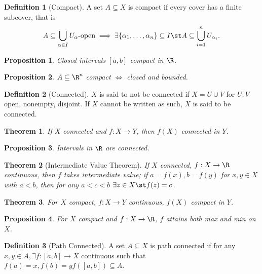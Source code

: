 \documentclass[12pt, oneside]{article}
\theoremstyle{definition}
\newtheorem{defn}{Definition}
\theoremstyle{plain}
\newtheorem{thm}{Theorem}
\newtheorem{prop}{Proposition}
\theoremstyle{remark}
\begin{document}
\begin{defn}[Compact]
  A set $A \subseteq X$ is compact if every cover has a finite subcover, that is \[
  A \subseteq \bigcup_{\alpha \in I} U_\alpha \text{-open} \implies \exists \{\alpha_1, \dots, \alpha_n\}   \subseteq I \st A \subseteq \bigcup_{i=1}^n U_{\alpha_i}.
  \]
\end{defn}

\begin{prop}
  Closed intervals $[a, b]$ compact in $\R$.
\end{prop}

\begin{prop}
  $A \subseteq \R^n$ compact $\iff $ closed and bounded.
\end{prop}

\begin{defn}[Connected]
  $X$ is said to not be connected if $X = U \cup V$ for $U, V$ open, nonempty, disjoint. If $X$ cannot be written as such, $X$ is said to be connected.
\end{defn}

\begin{thm}
  If $X$ connected and $f : X \to Y$, then $f(X)$ connected in $Y$.
\end{thm}

\begin{prop}
  Intervals in $\R$ are connected.
\end{prop}

\begin{thm}[Intermediate Value Theorem]
  If $X$ connected, $f : X \to \R$ continuous, then $f$ takes intermediate value; if $a = f(x), b = f(y)$ for $x, y \in X$ with $a < b$, then for any $a < c < b$ $\exists z \in X \st f(z) = c$.
\end{thm}

\begin{thm}
  For $X$ compact, $f : X \to Y$ continuous, $f(X)$ compact in $Y$.
\end{thm}

\begin{prop}
  For $X$ compact and $f: X \to \R$, $f$ attains both max and min on $X$.
\end{prop}

\begin{defn}[Path Connected]
  A set $A \subseteq X$ is path connected if for any $x, y \in A, \exists f : [a, b] \to X$ continuous such that $f(a) = x, f(b) = y f([a, b]) \subseteq A$.
\end{defn}
\end{document}
